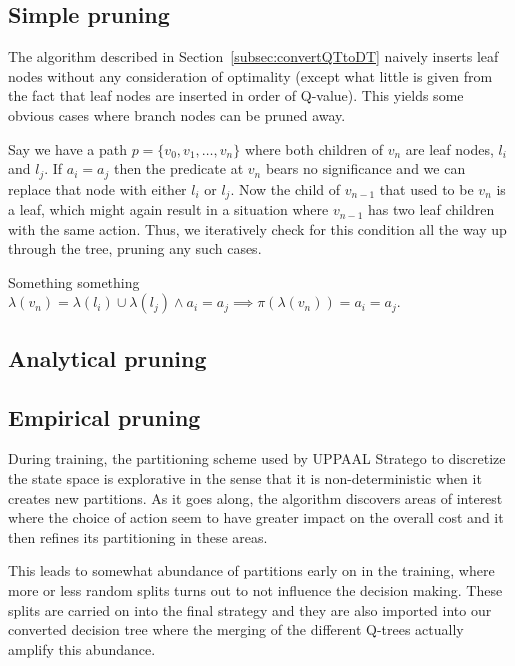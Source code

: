 \subsection{Simple pruning}%
\label{sub:simplePrune}


The algorithm described in Section~\ref{subsec:convertQTtoDT} naively inserts
leaf nodes without any consideration of optimality (except what little is given
from the fact that leaf nodes are inserted in order of Q-value). This yields
some obvious cases where branch nodes can be pruned away.

Say we have a path $p = \{v_0, v_1, \dots, v_n \}$ where both children of $v_n$ 
are leaf nodes, $l_i$ and $l_j$. If $a_i = a_j$ then the predicate at $v_n$
bears no significance and we can replace that node with either $l_i$ or $l_j$.
Now the child of $v_{n-1}$ that used to be $v_n$ is a leaf, which might again
result in a situation where $v_{n-1}$ has two leaf children with the same
action. Thus, we iteratively check for this condition all the way up through the
tree, pruning any such cases.

Something something $\lambda(v_n) = \lambda(l_i) \cup \lambda(l_j) \land a_i =
a_j \implies \pi(\lambda(v_n)) = a_i = a_j$.

\subsection{Analytical pruning}%
\label{sub:anaPrune}

\lipsum[1]


\subsection{Empirical pruning}%
\label{sub:empPrune}

During training, the partitioning scheme used by UPPAAL Stratego to discretize
the state space is explorative in the sense that it is non-deterministic when it
creates new partitions. As it goes along, the algorithm discovers areas of
interest where the choice of action seem to have greater impact on the overall
cost and it then refines its partitioning in these areas.

This leads to somewhat abundance of partitions early on in the training, where
more or less random splits turns out to not influence the decision making. These
splits are carried on into the final strategy and they are also imported into
our converted decision tree where the merging of the different Q-trees actually
amplify this abundance.

